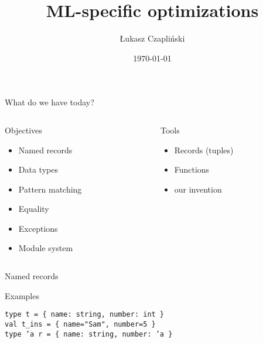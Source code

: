 \documentclass[presentation]{beamer}
\date{\today}
\title{ML-specific optimizations}
\author{Łukasz Czapliński}
\begin{document}
\maketitle

\begin{frame}{What do we have today?}
  \begin{columns}[T]
    \begin{column}{.48\textwidth}
      \begin{block}{Objectives}
        \begin{itemize}
        \item Named records
        \item Data types
        \item Pattern matching
        \item Equality
        \item Exceptions
        \item Module system
        \end{itemize}
      \end{block}
    \end{column}
    \begin{column}{.48\textwidth}
      \begin{block}{Tools}
        \begin{itemize}
        \item Records (tuples)
        \item Functions
        \item our invention
        \end{itemize}
      \end{block}
    \end{column}
  \end{columns}
\end{frame}

\begin{frame}[fragile]{Named records}
  \begin{block}{Examples}
\begin{verbatim}
type t = { name: string, number: int }
val t_ins = { name="Sam", number=5 }
type ’a r = { name: string, number: ’a }
\end{verbatim}
  \end{block}
\end{frame}
\end{document}
